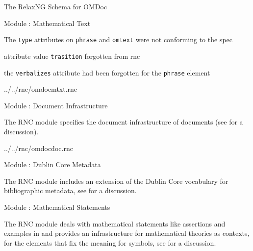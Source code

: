 \begin{tchapter}[id=rnc]{The RelaxNG Schema for OMDoc}
\begin{tsection}[id=rnc:mtxt]{Module {}: Mathematical Text}
\begin{erratum}[reported-by=Christoph Lange,date=2010-08-22]{The {\texttt{type}}
    attributes on {\texttt{phrase}} and {\texttt{omtext}} were not conforming to the spec}
\begin{erratum}[reported-by=Kristina Sojakova,date=2006-07-21]{attribute value
    {\texttt{trasition}} forgotten from rnc}
\begin{erratum}[reported-by=Michael Kohlhase,date=2008-07-01]{the {\texttt{verbalizes}}
    attribute had been forgotten for the {\texttt{phrase}} element}
 
  {../../rnc/omdocmtxt.rnc}
\end{erratum}
\end{erratum}
\end{erratum}
\end{tsection}

\begin{tsection}[id=rnc:doc]{Module {}: Document Infrastructure}
  
  The RNC module {} specifies the document infrastructure of
  {\omdoc} documents (see
  {} for a discussion).

  
  {../../rnc/omdocdoc.rnc}
\end{tsection}

\begin{tsection}[id=rnc:dc]{Module {}: Dublin Core Metadata}

  The RNC module {} includes an extension of the Dublin Core vocabulary for
  bibliographic metadata, see {} for a discussion.


\end{tsection}

\begin{tsection}[id=rnc:st]{Module {}: Mathematical Statements}

The RNC module {} deals with mathematical statements like assertions
and examples in {\omdoc} and provides an infrastructure for mathematical theories
as contexts, for the {\omdoc} elements that fix the meaning for symbols, see
{} for a discussion.


\end{tsection}
\end{tchapter}
